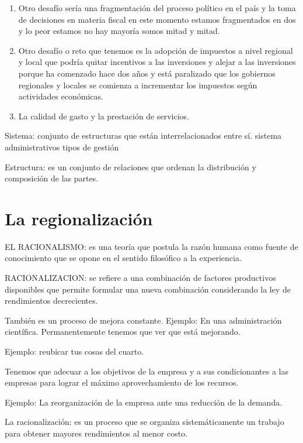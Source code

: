\documentclass[
  jou,
  floatsintext,
  longtable,
  a4paper,
  nolmodern,
  notxfonts,
  notimes,
  12pt,
  colorlinks=true,linkcolor=blue,citecolor=blue,urlcolor=blue]{apa7}
\begin{document}
\begin{enumerate}
  El reto también sería de tratar de incorporar empresas o actividades
  con economías de escala y nivelarnos con las otras.
\item
  Otro desafío sería una fragmentación del proceso político en el país y
  la toma de decisiones en materia fiscal en este momento estamos
  fragmentados en dos y lo peor estamos no hay mayoría somos mitad y
  mitad.
\item
  Otro desafío o reto que tenemos es la adopción de impuestos a nivel
  regional y local que podría quitar incentivos a las inversiones y
  alejar a las inversiones porque ha comenzado hace dos años y está
  paralizado que los gobiernos regionales y locales se comienza a
  incrementar los impuestos según actividades económicas.
\item
  La calidad de gasto y la prestación de servicios.
\end{enumerate}

Sistema: conjunto de estructuras que están interrelacionados entre sí.
sistema administrativos tipos de gestión

Estructura: es un conjunto de relaciones que ordenan la distribución y
composición de las partes.

\section{La regionalización}\label{la-regionalizaciuxf3n}

EL RACIONALISMO: es una teoría que postula la razón humana como fuente
de conocimiento que se opone en el sentido filosófico a la experiencia.

RACIONALIZACION: se refiere a una combinación de factores productivos
disponibles que permite formular una nueva combinación considerando la
ley de rendimientos decrecientes.

También es un proceso de mejora constante. Ejemplo: En una
administración científica. Permanentemente tenemos que ver que está
mejorando.

Ejemplo: reubicar tus cosas del cuarto.

Tenemos que adecuar a los objetivos de la empresa y a sus condicionantes
a las empresas para lograr el máximo aprovechamiento de los recursos.

Ejemplo: La reorganización de la empresa ante una reducción de la
demanda.

La racionalización: es un proceso que se organiza sistemáticamente un
trabajo para obtener mayores rendimientos al menor costo.
\end{document}
